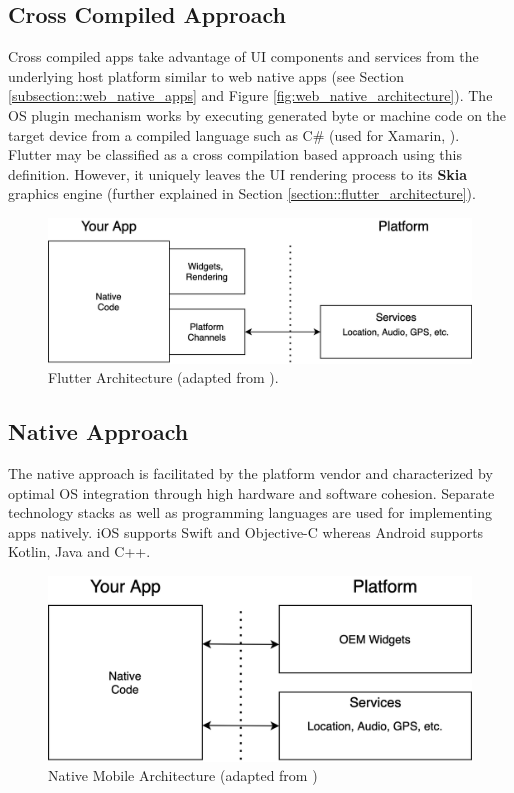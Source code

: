 \subsection{Cross Compiled Approach} \label{subsection::cross_compiled_approach}
Cross compiled apps take advantage of UI components and services from the underlying host platform similar to web native apps (see Section \ref{subsection::web_native_apps} and Figure \ref{fig:web_native_architecture}).
The OS plugin mechanism works by executing generated byte or machine code on the target device from a compiled language such as C\# (used for Xamarin, \cite{Xamarin2021}).\\
Flutter may be classified as a cross compilation based approach using this definition. However, it uniquely leaves the UI rendering process to its \textbf{Skia} graphics engine (further explained in Section \ref{section::flutter_architecture}).

\begin{figure}
    \centering
    \includegraphics[width=.8\linewidth]{images/architectures/flutter_architecture.png}
    \caption{Flutter Architecture (adapted from \cite{Cunha2018}).}
    \label{fig:flutter_architecture}
\end{figure}

\subsection{Native Approach}
The native approach is facilitated by the platform vendor and characterized by optimal OS integration through high hardware and software cohesion.
Separate technology stacks as well as programming languages are used for implementing apps natively. 
iOS supports Swift and Objective-C whereas Android supports Kotlin, Java and C++.

\begin{figure}
    \centering
    \includegraphics[width=.7\linewidth]{images/architectures/native_architecture.png}
    \caption{Native Mobile Architecture (adapted from \cite{Cunha2018})}
    \label{fig:native_architecture}
\end{figure}

